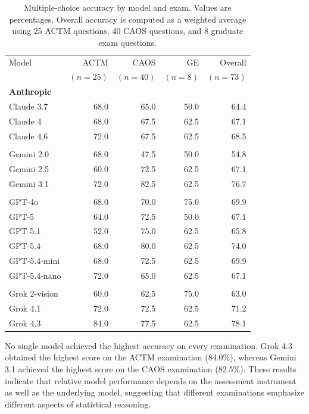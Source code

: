 \documentclass[APA,LATO2COL]{WileyNJDv5}
\begin{document}
\begin{table}[htbp]
\centering
\caption{Multiple-choice accuracy by model and exam. Values are percentages. Overall accuracy is computed as a weighted average using 25 ACTM questions, 40 CAOS questions, and 8 graduate exam questions.}
\label{tab:mc_accuracy_model_exam}
\begin{tabular}{lrrrr}
\toprule
Model & ACTM & CAOS & GE & Overall \\
            & $(n=25)$ & $(n=40)$ & $(n=8)$ & $(n=73)$ \\
\midrule
\multicolumn{5}{l}{\textbf{Anthropic}} \\
Claude 3.7 & 68.0 & 65.0 & 50.0 & 64.4 \\
Claude 4   & 68.0 & 67.5 & 62.5 & 67.1 \\
Claude 4.6 & 72.0 & 67.5 & 62.5 & 68.5 \\
\addlinespace

\multicolumn{5}{l}{\textbf{Google}} \\
Gemini 2.0 & 68.0 & 47.5 & 50.0 & 54.8 \\
Gemini 2.5 & 60.0 & 72.5 & 62.5 & 67.1 \\
Gemini 3.1 & 72.0 & 82.5 & 62.5 & 76.7 \\
\addlinespace

\multicolumn{5}{l}{\textbf{OpenAI}} \\
 GPT-4o        & 68.0 & 70.0 & 75.0 & 69.9 \\
GPT-5         & 64.0 & 72.5 & 50.0 & 67.1 \\
GPT-5.1       & 52.0 & 75.0 & 62.5 & 65.8 \\
GPT-5.4       & 68.0 & 80.0 & 62.5 & 74.0 \\
GPT-5.4-mini  & 68.0 & 72.5 & 62.5 & 69.9 \\
GPT-5.4-nano  & 72.0 & 65.0 & 62.5 & 67.1 \\
\addlinespace

\multicolumn{5}{l}{\textbf{xAI}} \\
Grok 2-vision & 60.0 & 62.5 & 75.0 & 63.0 \\
Grok 4.1      & 72.0 & 72.5 & 62.5 & 71.2 \\
Grok 4.3      & 84.0 & 77.5 & 62.5 & 78.1 \\
\bottomrule
\end{tabular}
\end{table}

No single model achieved the highest accuracy on every examination. Grok 4.3 obtained the highest score on the ACTM examination (84.0\%), whereas Gemini 3.1 achieved the highest score on the CAOS examination (82.5\%). These results indicate that relative model performance depends on the assessment instrument as well as the underlying model, suggesting that different examinations emphasize different aspects of statistical reasoning.
\end{document}

